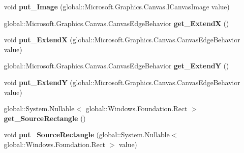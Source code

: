 \begin{DoxyCompactItemize}
void {\bfseries put\+\_\+\+Image} (global\+::\+Microsoft.\+Graphics.\+Canvas.\+I\+Canvas\+Image value)
\item 
\mbox{\label{class_microsoft_1_1_graphics_1_1_canvas_1_1_brushes_1_1_canvas_image_brush_ab8eedf6b67df8a2df6174d213c8ff556}} 
global\+::\+Microsoft.\+Graphics.\+Canvas.\+Canvas\+Edge\+Behavior {\bfseries get\+\_\+\+ExtendX} ()
\item 
\mbox{\label{class_microsoft_1_1_graphics_1_1_canvas_1_1_brushes_1_1_canvas_image_brush_aca638fc134d4d7aeb045f7af68be64d4}} 
void {\bfseries put\+\_\+\+ExtendX} (global\+::\+Microsoft.\+Graphics.\+Canvas.\+Canvas\+Edge\+Behavior value)
\item 
\mbox{\label{class_microsoft_1_1_graphics_1_1_canvas_1_1_brushes_1_1_canvas_image_brush_a6d17dd87d557c5dd892bcd91ed6d580c}} 
global\+::\+Microsoft.\+Graphics.\+Canvas.\+Canvas\+Edge\+Behavior {\bfseries get\+\_\+\+ExtendY} ()
\item 
\mbox{\label{class_microsoft_1_1_graphics_1_1_canvas_1_1_brushes_1_1_canvas_image_brush_a74ff40530cc12913c1a2aed1c6a29603}} 
void {\bfseries put\+\_\+\+ExtendY} (global\+::\+Microsoft.\+Graphics.\+Canvas.\+Canvas\+Edge\+Behavior value)
\item 
\mbox{\label{class_microsoft_1_1_graphics_1_1_canvas_1_1_brushes_1_1_canvas_image_brush_a026484de4f62a1ee93a4dbe3b556bc35}} 
global\+::\+System.\+Nullable$<$ global\+::\+Windows.\+Foundation.\+Rect $>$ {\bfseries get\+\_\+\+Source\+Rectangle} ()
\item 
\mbox{\label{class_microsoft_1_1_graphics_1_1_canvas_1_1_brushes_1_1_canvas_image_brush_a06ce9ecc2a14f31cc237bf4f1d636c3b}} 
void {\bfseries put\+\_\+\+Source\+Rectangle} (global\+::\+System.\+Nullable$<$ global\+::\+Windows.\+Foundation.\+Rect $>$ value)
\item 
\mbox{\label{class_microsoft_1_1_graphics_1_1_canvas_1_1_brushes_1_1_canvas_image_brush_aa876d16918c915a266a3e9223dc1d6d3}} 

\end{DoxyCompactItemize}
